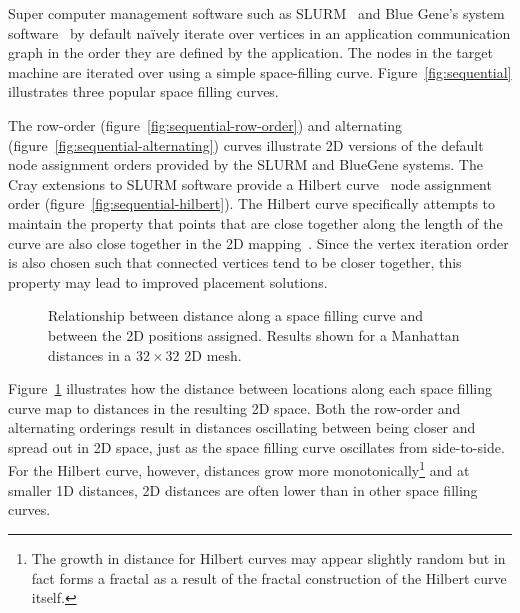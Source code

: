 				Super computer management software such as SLURM~\cite{yoo03} and Blue
				Gene's system software~\cite{gilge14} by default na\"ively iterate over
				vertices in an application communication graph in the order they are
				defined by the application. The nodes in the target machine are
				iterated over using a simple space-filling curve.
				Figure~\ref{fig:sequential} illustrates three popular space filling
				curves.
				
				The row-order (figure~\ref{fig:sequential-row-order}) and alternating
				(figure~\ref{fig:sequential-alternating}) curves illustrate 2D versions
				of the default node assignment orders provided by the SLURM and
				BlueGene systems.  The Cray extensions to SLURM software provide a
				Hilbert curve~\cite{hilbert91} node assignment order
				(figure~\ref{fig:sequential-hilbert}). The Hilbert curve specifically
				attempts to maintain the property that points that are close together
				along the length of the curve are also close together in the 2D
				mapping~\cite{moon01, zumbusch99}. Since the vertex iteration order is
				also chosen such that connected vertices tend to be closer together,
				this property may lead to improved placement solutions.
				
				\begin{figure}
					\center
					
					\caption[Relationship between space filling curve offset and 2D space.]%
					{Relationship between distance along a space filling curve
					and between the 2D positions assigned. Results shown for a
					Manhattan distances in a $32\times32$ 2D mesh.}
					\label{fig:space_filling_curves_comparison}
				\end{figure}
				
				Figure~\ref{fig:space_filling_curves_comparison} illustrates how the
				distance between locations along each space filling curve map to
				distances in the resulting 2D space. Both the row-order and alternating
				orderings result in distances oscillating between being closer and
				spread out in 2D space, just as the space filling curve oscillates from
				side-to-side. For the Hilbert curve, however, distances grow more
				monotonically\footnote{The growth in distance for Hilbert curves may
				appear slightly random but in fact forms a fractal as a result of the
				fractal construction of the Hilbert curve itself.} and at smaller 1D
				distances, 2D distances are often lower than in other space filling
				curves.
				
